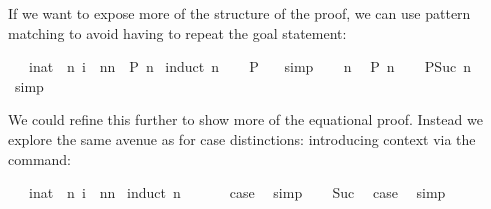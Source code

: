 \begin{isabellebody}
\begin{isamarkuptext}
If we want to expose more of the structure of the
proof, we can use pattern matching to avoid having to repeat the goal
statement:%
\end{isamarkuptext}%
\isamarkuptrue%
\ {\isachardoublequote}{}\ {\isacharasterisk}\ {\isacharparenleft}{\isasymSum}i{\isacharcolon}{\isacharcolon}nat\ {\isacharequal}\ {}{\isachardot}{\isachardot}{\isacharless}n{\isacharplus}{}{\isachardot}\ i{\isacharparenright}\ {\isacharequal}\ n{\isacharasterisk}{\isacharparenleft}n{\isacharplus}{}{\isacharparenright}{\isachardoublequote}\ {\isacharparenleft}\ {\isachardoublequote}{\isacharquery}P\ n{\isachardoublequote}{\isacharparenright}\isanewline
\isamarkupfalse%
\ {\isacharparenleft}induct\ n{\isacharparenright}\isanewline
\ \ \isamarkupfalse%
\ {\isachardoublequote}{\isacharquery}P\ {}{\isachardoublequote}\ \isamarkupfalse%
\ simp\isanewline
\isamarkupfalse%
\isanewline
\ \ \isamarkupfalse%
\ n\ \isamarkupfalse%
\ {\isachardoublequote}{\isacharquery}P\ n{\isachardoublequote}\isanewline
\ \ \isamarkupfalse%
\ {\isachardoublequote}{\isacharquery}P{\isacharparenleft}Suc\ n{\isacharparenright}{\isachardoublequote}\ \isamarkupfalse%
\ simp\isanewline
\isamarkupfalse%
\isamarkupfalse%
%
\begin{isamarkuptext}%
\noindent We could refine this further to show more of the equational
proof. Instead we explore the same avenue as for case distinctions:
introducing context via the  command:%
\end{isamarkuptext}%
\isamarkuptrue%
\ {\isachardoublequote}{}\ {\isacharasterisk}\ {\isacharparenleft}{\isasymSum}i{\isacharcolon}{\isacharcolon}nat\ {\isacharless}\ n{\isacharplus}{}{\isachardot}\ i{\isacharparenright}\ {\isacharequal}\ n{\isacharasterisk}{\isacharparenleft}n{\isacharplus}{}{\isacharparenright}{\isachardoublequote}\isanewline
\isamarkupfalse%
\ {\isacharparenleft}induct\ n{\isacharparenright}\isanewline
\ \ \isamarkupfalse%
\ {}\ \isamarkupfalse%
\ {\isacharquery}case\ \isamarkupfalse%
\ simp\isanewline
\isamarkupfalse%
\isanewline
\ \ \isamarkupfalse%
\ Suc\ \isamarkupfalse%
\ {\isacharquery}case\ \isamarkupfalse%
\ simp\isanewline

\end{isabellebody}

